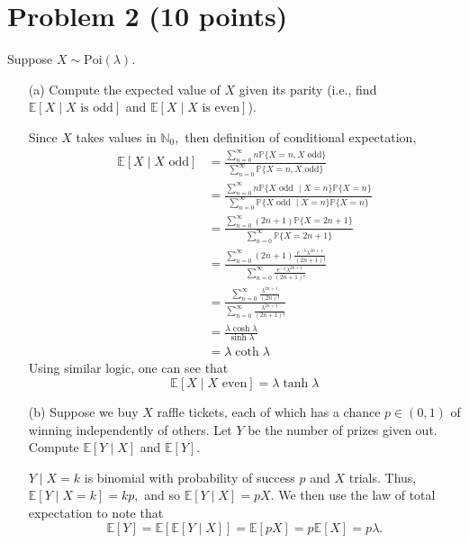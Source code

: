 \documentclass[11pt]{article}
\newcommand{\bbE}{\mathbb{E}}
\newcommand{\bbN}{\mathbb{N}}
\newcommand{\bbP}{\mathbb{P}}
\begin{document}
\section*{Problem 2 (10 points)}
Suppose \(X \sim \text{Poi}(\lambda)\).
\begin{itemize}
    \item[(a)] Compute the expected value of \(X\) given its parity (i.e., find \(\mathbb{E}[X \mid X \text{ is odd}]\) and \(\mathbb{E}[X \mid X \text{ is even}]\)).
    \begin{solution}
    Since $X$ takes values in $\bbN_0,$ then definition of conditional expectation, 
    \begin{align*}
        \bbE[X \mid X \text{ odd}] &= \frac{\displaystyle\sum_{n = 0}^\infty n \bbP\{X= n, X \text{ odd}\}}{\displaystyle\sum_{n=0}^\infty  \bbP\{X = n, X \text{ odd}\}}\\
        &= \frac{\displaystyle\sum_{n = 0}^\infty n \bbP\{X \text{ odd } \mid X = n\}\bbP\{X= n\}}{\displaystyle\sum_{n=0}^\infty  \bbP\{X \text{ odd } \mid X = n\}\bbP\{X= n\}}\\
        &= \frac{\displaystyle\sum_{n = 0}^\infty (2n+1) \bbP\{X= 2n+1\}}{\displaystyle\sum_{n=0}^\infty  \bbP\{X= 2n+1\}}\\
        &= \frac{\displaystyle\sum_{n = 0}^\infty (2n+1) \frac{e^{-\lambda}\lambda^{2n +1}}{(2n+1)!}}{\displaystyle\sum_{n=0}^\infty  \frac{e^{-\lambda}\lambda^{2n +1}}{(2n+1)!}}\\
        &= \frac{\displaystyle\sum_{n=0}^\infty \frac{\lambda^{2n +1}}{(2n)!}}{\displaystyle\sum_{n=0}^\infty \frac{\lambda^{2n +1}}{(2n+1)!}}\\
        &= \frac{\lambda \cosh{\lambda}}{\sinh{\lambda}}\\
        &= \lambda \coth{\lambda}
    \end{align*}
    Using similar logic, one can see that 
    \[\bbE[X \mid X\text{ even}]=  \lambda \tanh{\lambda}\]
    \end{solution}
    \item[(b)] Suppose we buy \(X\) raffle tickets, each of which has a chance \(p \in (0, 1)\) of winning independently of others. Let \(Y\) be the number of prizes given out. Compute \(\mathbb{E}[Y \mid X]\) and \(\mathbb{E}[Y]\).
    \begin{solution}
$Y \mid X = k$ is binomial with probability of success $p$ and $X$ trials. Thus, $\bbE[Y \mid X = k] = k p,$ and so $\bbE[Y \mid X] = pX.$ We then use the law of total expectation to note that
\[\bbE[Y] = \bbE[\bbE[Y \mid X]] = \bbE[pX] = p\bbE[X] = p\lambda.\]

    \end{solution}
\end{itemize}
\end{document}
